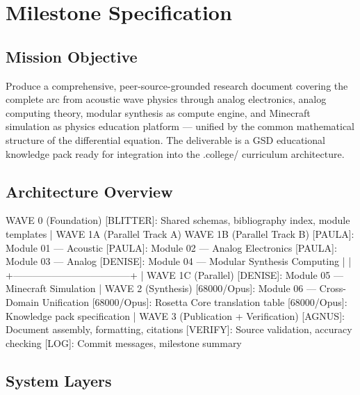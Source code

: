 \documentclass[11pt,letterpaper]{article}
\newcommand{\stageheader}[2]{%
  \noindent\colorbox{#2}{\makebox[\textwidth][l]{%
    \textcolor{white}{\bfseries\sffamily\hspace{6pt}#1\hspace{6pt}}}}%
  \vspace{0.5em}\par%
}
\begin{document}
\newpage

\stageheader{STAGE 3 --- MISSION PACKAGE}{tertiary}

\section{Milestone Specification}

\subsection{Mission Objective}

Produce a comprehensive, peer-source-grounded research document covering the complete arc from acoustic wave physics through analog electronics, analog computing theory, modular synthesis as compute engine, and Minecraft simulation as physics education platform --- unified by the common mathematical structure of the differential equation. The deliverable is a GSD educational knowledge pack ready for integration into the .college/ curriculum architecture.

\subsection{Architecture Overview}

\begin{asciibox}
WAVE 0 (Foundation)
  [BLITTER]: Shared schemas, bibliography index, module templates
       |
WAVE 1A (Parallel Track A)          WAVE 1B (Parallel Track B)
  [PAULA]: Module 01 — Acoustic      [PAULA]: Module 02 — Analog Electronics
  [PAULA]: Module 03 — Analog        [DENISE]: Module 04 — Modular Synthesis
           Computing
       |                                    |
       +------------------------------------+
                        |
WAVE 1C (Parallel)
  [DENISE]: Module 05 — Minecraft Simulation
       |
WAVE 2 (Synthesis)
  [68000/Opus]: Module 06 — Cross-Domain Unification
  [68000/Opus]: Rosetta Core translation table
  [68000/Opus]: Knowledge pack specification
       |
WAVE 3 (Publication + Verification)
  [AGNUS]: Document assembly, formatting, citations
  [VERIFY]: Source validation, accuracy checking
  [LOG]: Commit messages, milestone summary
\end{asciibox}

\subsection{System Layers}
\end{document}
